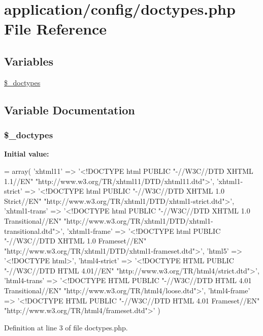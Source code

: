 \hypertarget{doctypes_8php}{\section{application/config/doctypes.php File Reference}
\label{doctypes_8php}
}
\subsection*{Variables}
\begin{DoxyCompactItemize}
\item 
\hyperlink{doctypes_8php_aae4e5521057605d22a78c29c7d4ad7de}{\$\-\_\-doctypes}
\end{DoxyCompactItemize}


\subsection{Variable Documentation}
\hypertarget{doctypes_8php_aae4e5521057605d22a78c29c7d4ad7de}{
\subsubsection[{\$\-\_\-doctypes}]{\setlength{\rightskip}{0pt plus 5cm}\$\-\_\-doctypes}}\label{doctypes_8php_aae4e5521057605d22a78c29c7d4ad7de}
{\bfseries Initial value\-:}
\begin{DoxyCode}
= array(
                    \textcolor{stringliteral}{'xhtml11'}       => \textcolor{stringliteral}{'<!DOCTYPE html PUBLIC "-//W3C//DTD XHTML 1.1//EN"
       "http://www.w3.org/TR/xhtml11/DTD/xhtml11.dtd">'},
                    \textcolor{stringliteral}{'xhtml1-strict'} => \textcolor{stringliteral}{'<!DOCTYPE html PUBLIC "-//W3C//DTD XHTML 1.0 Strict//EN"
       "http://www.w3.org/TR/xhtml1/DTD/xhtml1-strict.dtd">'},
                    \textcolor{stringliteral}{'xhtml1-trans'}  => \textcolor{stringliteral}{'<!DOCTYPE html PUBLIC "-//W3C//DTD XHTML 1.0 Transitional//EN"
       "http://www.w3.org/TR/xhtml1/DTD/xhtml1-transitional.dtd">'},
                    \textcolor{stringliteral}{'xhtml1-frame'}  => \textcolor{stringliteral}{'<!DOCTYPE html PUBLIC "-//W3C//DTD XHTML 1.0 Frameset//EN"
       "http://www.w3.org/TR/xhtml1/DTD/xhtml1-frameset.dtd">'},
                    \textcolor{stringliteral}{'html5'}         => \textcolor{stringliteral}{'<!DOCTYPE html>'},
                    \textcolor{stringliteral}{'html4-strict'}  => \textcolor{stringliteral}{'<!DOCTYPE HTML PUBLIC "-//W3C//DTD HTML 4.01//EN"
       "http://www.w3.org/TR/html4/strict.dtd">'},
                    \textcolor{stringliteral}{'html4-trans'}   => \textcolor{stringliteral}{'<!DOCTYPE HTML PUBLIC "-//W3C//DTD HTML 4.01 Transitional//EN"
       "http://www.w3.org/TR/html4/loose.dtd">'},
                    \textcolor{stringliteral}{'html4-frame'}   => \textcolor{stringliteral}{'<!DOCTYPE HTML PUBLIC "-//W3C//DTD HTML 4.01 Frameset//EN"
       "http://www.w3.org/TR/html4/frameset.dtd">'}
                    )
\end{DoxyCode}


Definition at line 3 of file doctypes.\-php.

